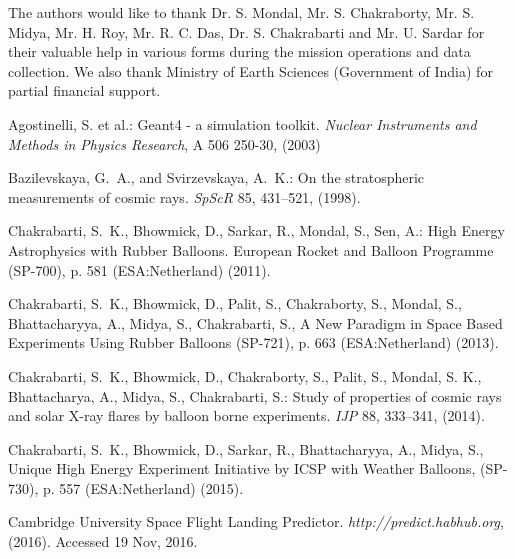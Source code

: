 \begin{acknowledgements}
The authors would like to thank Dr. S. Mondal, Mr. S. Chakraborty, Mr. S.
Midya, Mr. H. Roy, Mr. R. C. Das, Dr. S. Chakrabarti and Mr. U. Sardar for their valuable help
in various forms during the mission operations and data collection. We also
thank Ministry of Earth Sciences (Government of India) for partial financial
support.
\end{acknowledgements}


\begin{thebibliography}{[10]}
%

 Agostinelli, S. et al.: 
Geant4 - a simulation toolkit. \textit{Nuclear Instruments and Methods in 
Physics Research}, A 506 250-30, (2003)

Bazilevskaya, G.~A., and Svirzevskaya, A.~K.: On the stratospheric
measurements of cosmic rays. \textit{SpScR} 85, 431--521, (1998).

 Chakrabarti, S.~K.,
Bhowmick, D., Sarkar, R., Mondal, S., Sen, A.: 
High Energy Astrophysics with Rubber Balloons. European Rocket and Balloon Programme
(SP-700), p. 581  (ESA:Netherland) (2011).

 Chakrabarti, S.~K.,
Bhowmick, D., Palit, S., Chakraborty, S.,  Mondal, S., Bhattacharyya, A., Midya, S.,
Chakrabarti, S., A New Paradigm in Space Based Experiments Using Rubber Balloons
(SP-721), p. 663 (ESA:Netherland) (2013).

 Chakrabarti, S.~K.,
Bhowmick, D., Chakraborty, S., Palit, S., Mondal, S. K., Bhattacharya, A.,
Midya, S., Chakrabarti, S.: Study of properties of cosmic rays and solar 
X-ray flares by balloon borne experiments. \textit{IJP} 88, 333--341, (2014).

 Chakrabarti, S.~K.,
Bhowmick, D., Sarkar, R., Bhattacharyya, A., Midya, S., Unique High Energy Experiment
Initiative by ICSP with Weather Balloons, (SP-730), p. 557 (ESA:Netherland) (2015).

 Cambridge University 
Space Flight Landing Predictor. \textit{http://predict.habhub.org}, (2016). 
Accessed 19 Nov, 2016.


\end{thebibliography}
